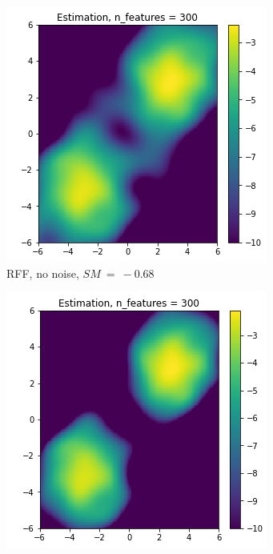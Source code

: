 \begin{figure}[!ht]
\begin{subfigure}[b]{0.32\textwidth}
    \includegraphics[width=\textwidth]{figures/score_matching/exps/taylor_MoG.png}
    \captionsetup{justification=centering}
    \caption{RFF, no noise, $SM~=~-0.68$}
    \label{sfig:MoGrff}
  \end{subfigure}
  \begin{subfigure}[b]{0.32\textwidth}
    \includegraphics[width=\textwidth]{figures/score_matching/exps/taylor_MoG_noise_1.png}

\end{subfigure}
\end{figure}
